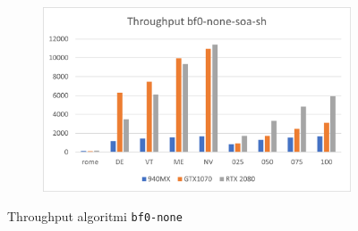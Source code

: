 \documentclass[12pt,a4paper,oneside]{book}
\begin{document}
\begin{figure}[b]
\begin{subfigure}{.5\textwidth}
		\end{subfigure}%
		\begin{subfigure}{.5\textwidth}
			\centering
			\includegraphics[width=\textwidth]{throughput_bf0-none-soa-sh}
		\end{subfigure}
		\caption{Throughput algoritmi \texttt{bf0-none}}
		\label{fig:throughput_bf0-none}
	\end{figure}
	
\end{document}
